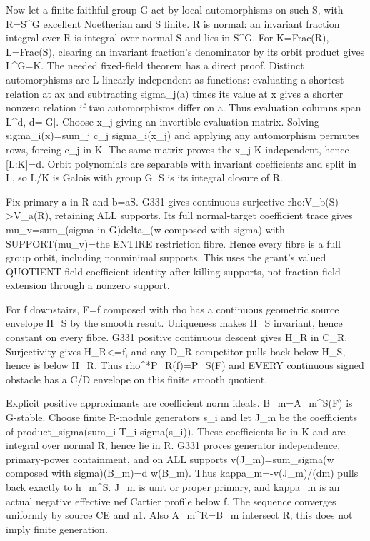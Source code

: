 \documentclass[11pt]{article}
\begin{document}
Now let a finite faithful group G act by local automorphisms on such S, with R=S\textasciicircum{}G excellent Noetherian and S finite. R is normal: an invariant fraction integral over R is integral over normal S and lies in S\textasciicircum{}G. For K=Frac(R), L=Frac(S), clearing an invariant fraction's denominator by its orbit product gives L\textasciicircum{}G=K. The needed fixed-field theorem has a direct proof. Distinct automorphisms are L-linearly independent as functions: evaluating a shortest relation at ax and subtracting sigma\_j(a) times its value at x gives a shorter nonzero relation if two automorphisms differ on a. Thus evaluation columns span L\textasciicircum{}d, d=|G|. Choose x\_j giving an invertible evaluation matrix. Solving sigma\_i(x)=sum\_j c\_j sigma\_i(x\_j) and applying any automorphism permutes rows, forcing c\_j in K. The same matrix proves the x\_j K-independent, hence [L:K]=d. Orbit polynomials are separable with invariant coefficients and split in L, so L/K is Galois with group G. S is its integral closure of R.

Fix primary a in R and b=aS. G331 gives continuous surjective rho:V\_b(S)-\textgreater{}V\_a(R), retaining ALL supports. Its full normal-target coefficient trace gives mu\_v=sum\_(sigma in G)delta\_(w composed with sigma) with SUPPORT(mu\_v)=the ENTIRE restriction fibre. Hence every fibre is a full group orbit, including nonminimal supports. This uses the grant's valued QUOTIENT-field coefficient identity after killing supports, not fraction-field extension through a nonzero support.

For f downstairs, F=f composed with rho has a continuous geometric source envelope H\_S by the smooth result. Uniqueness makes H\_S invariant, hence constant on every fibre. G331 positive continuous descent gives H\_R in C\_R. Surjectivity gives H\_R\textless{}=f, and any D\_R competitor pulls back below H\_S, hence is below H\_R. Thus rho\textasciicircum{}*P\_R(f)=P\_S(F) and EVERY continuous signed obstacle has a C/D envelope on this finite smooth quotient.

Explicit positive approximants are coefficient norm ideals. B\_m=A\_m\textasciicircum{}S(F) is G-stable. Choose finite R-module generators s\_i and let J\_m be the coefficients of product\_sigma(sum\_i T\_i sigma(s\_i)). These coefficients lie in K and are integral over normal R, hence lie in R. G331 proves generator independence, primary-power containment, and on ALL supports v(J\_m)=sum\_sigma(w composed with sigma)(B\_m)=d w(B\_m). Thus kappa\_m=-v(J\_m)/(dm) pulls back exactly to h\_m\textasciicircum{}S. J\_m is unit or proper primary, and kappa\_m is an actual negative effective nef Cartier profile below f. The sequence converges uniformly by source CE and n1. Also A\_m\textasciicircum{}R=B\_m intersect R; this does not imply finite generation.
\end{document}
